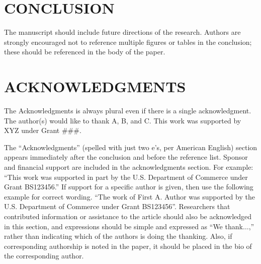 \documentclass{IEEEcsmag}
\begin{document}
\section{CONCLUSION}
The manuscript should include future directions of the research. Authors are strongly encouraged not to reference multiple figures or tables in the conclusion; these should be referenced in the body of the paper.\vspace*{-8pt}


\section{ACKNOWLEDGMENTS}
The Acknowledgments is always plural even if there is a single acknowledgment. The author(s) would like to thank A, B, and C. This work was supported by XYZ under Grant \#\#\#.


The ``Acknowledgments'' (spelled with just two e's, per American English) section appears immediately after the conclusion and before the reference list. Sponsor and financial support  are included in the acknowledgments section. For example: ``This work was supported in part by the U.S. Department of Commerce under Grant BS123456.'' If support for a specific author is given, then use the following example for correct  wording. ``The work of First A. Author was supported by the U.S. Department of Commerce under Grant BS123456''. Researchers that contributed information or assistance to the article should also be acknowledged in this section, and expressions should be simple and expressed as ``We thank$\ldots$,'' rather than indicating which of the authors is doing the thanking. Also, if corresponding authorship is noted in the paper, it should be placed in the bio of the corresponding author.


\def\refname{REFERENCES}
\end{document}
